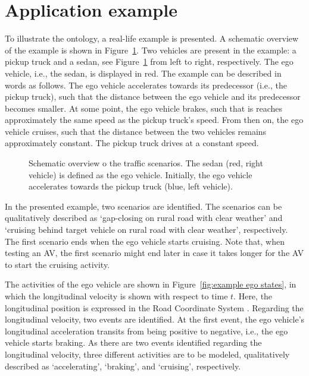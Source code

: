 \section{Application example}
\label{sec:example}

To illustrate the ontology, a real-life example is presented. A schematic overview of the example is shown in Figure~\ref{fig:example schematic}. Two vehicles are present in the example: a pickup truck and a sedan, see Figure~\ref{fig:example schematic} from left to right, respectively. The ego vehicle, i.e., the sedan, is displayed in red. The example can be described in words as follows. The ego vehicle accelerates towards its predecessor (i.e., the pickup truck), such that the distance between the ego vehicle and its predecessor becomes smaller. At some point, the ego vehicle brakes, such that is reaches approximately the same speed as the pickup truck's speed. From then on, the ego vehicle cruises, such that the distance between the two vehicles remains approximately constant. The pickup truck drives at a constant speed.

\begin{figure}
	\centering
	\setlength\figureheight{121pt}
	\setlength\figurewidth{260pt}
	
	\caption{Schematic overview o the traffic scenarios. The sedan (red, right vehicle) is defined as the ego vehicle. Initially, the ego vehicle accelerates towards the pickup truck (blue, left vehicle).}
	\label{fig:example schematic}
\end{figure}

In the presented example, two scenarios are identified. The scenarios can be qualitatively described as `gap-closing on rural road with clear weather' and `cruising behind target vehicle on rural road with clear weather', respectively. The first scenario ends when the ego vehicle starts cruising. Note that, when testing an AV, the first scenario might end later in case it takes longer for the AV to start the cruising activity.

The activities of the ego vehicle are shown in Figure~\ref{fig:example ego states}, in which the longitudinal velocity is shown with respect to time $t$. Here, the longitudinal position is expressed in the Road Coordinate System \cite{zofka2015datadrivetrafficscenarios}. Regarding the longitudinal velocity, two events are identified. At the first event, the ego vehicle's longitudinal acceleration transits from being positive to negative, i.e., the ego vehicle starts braking. As there are two events identified regarding the longitudinal velocity, three different activities are to be modeled, qualitatively described as `accelerating', `braking', and `cruising', respectively. 

